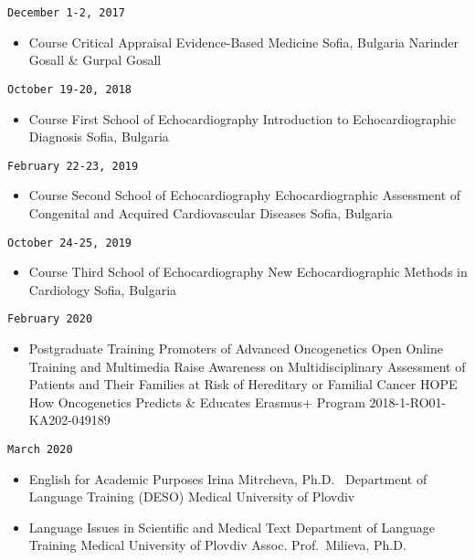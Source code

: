 \documentclass[
  12pt,
  letterpaper,
  DIV=11,
  numbers=noendperiod]{scrartcl}
\providecommand{\tightlist}{%
  \setlength{\itemsep}{0pt}\setlength{\parskip}{0pt}}\usepackage{longtable,booktabs,array}
\begin{document}
\texttt{December\ 1-2,\ 2017}

\begin{itemize}
\tightlist
\item
  Course \textbar{} Critical Appraisal \textbar{} Evidence-Based
  Medicine \textbar{} Sofia, Bulgaria \textbar{} Narinder Gosall \&
  Gurpal Gosall
\end{itemize}

\texttt{October\ 19-20,\ 2018}

\begin{itemize}
\tightlist
\item
  Course \textbar{} First School of Echocardiography \textbar{}
  Introduction to Echocardiographic Diagnosis \textbar{} Sofia, Bulgaria
\end{itemize}

\texttt{February\ 22-23,\ 2019}

\begin{itemize}
\tightlist
\item
  Course \textbar{} Second School of Echocardiography \textbar{}
  Echocardiographic Assessment of Congenital and Acquired Cardiovascular
  Diseases \textbar{} Sofia, Bulgaria
\end{itemize}

\texttt{October\ 24-25,\ 2019}

\begin{itemize}
\tightlist
\item
  Course \textbar{} Third School of Echocardiography \textbar{} New
  Echocardiographic Methods in Cardiology \textbar{} Sofia, Bulgaria
\end{itemize}

\texttt{February\ 2020}

\begin{itemize}
\tightlist
\item
  Postgraduate Training \textbar{} Promoters of Advanced Oncogenetics
  \textbar{} Open Online Training and Multimedia Raise Awareness on
  Multidisciplinary Assessment of Patients and Their Families at Risk of
  Hereditary or Familial Cancer \textbar{} HOPE How Oncogenetics
  Predicts \& Educates Erasmus+ Program 2018-1-RO01-KA202-049189
\end{itemize}

\texttt{March\ 2020}

\begin{itemize}
\item
  English for Academic Purposes \textbar{} Irina Mitrcheva,
  Ph.D.~\textbar{} Department of Language Training (DESO) \textbar{}
  Medical University of Plovdiv
\item
  Language Issues in Scientific and Medical Text \textbar{} Department
  of Language Training \textbar{} Medical University of Plovdiv
  \textbar{} Assoc. Prof.~Milieva, Ph.D.
\end{itemize}
\end{document}
